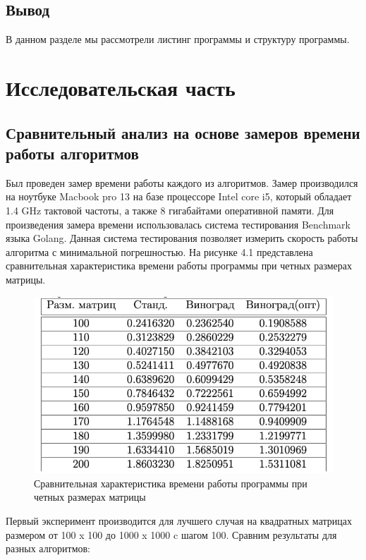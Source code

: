 \documentclass[12pt]{report}
\begin{document}
\section{Вывод}
В данном разделе мы рассмотрели листинг программы и структуру программы.

\chapter{Исследовательская часть}

\section{Сравнительный анализ на основе замеров времени работы алгоритмов}

Был проведен замер времени работы каждого из алгоритмов. Замер производился на ноутбуке Macbook pro 13 на базе процессоре Intel core i5, который обладает  1.4 GHz тактовой частоты, а также 8 гигабайтами оперативной памяти.\cite{computer}\cite{intel} Для произведения замера времени использовалась система тестирования Benchmark языка Golang.
Данная система тестирования позволяет измерить скорость работы алгоритма с минимальной погрешностью. \newline
На рисунке 4.1 представлена сравнительная характеристика времени работы программы при четных размерах матрицы.
\begin{figure}[H]
    \centering
    \includegraphics[width=0.70\linewidth]{8.jpg}
    \caption{Сравнительная характеристика времени работы программы при четных размерах матрицы}
    \label{fig:mpr}
\end{figure}
\newline
\newpage


Первый эксперимент производится для лучшего случая на квадратных матрицах размером от 100 x 100 до 1000 x 1000 c шагом 100. 
Сравним результаты для разных алгоритмов:
\end{document}
